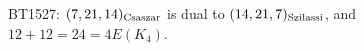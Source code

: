 \begin{center}\small
BT1527: $(7,21,14)_{\rm Csaszar}$ is dual to $(14,21,7)_{\rm Szilassi}$, and $12+12=24=4E(K_4)$.
\end{center}
